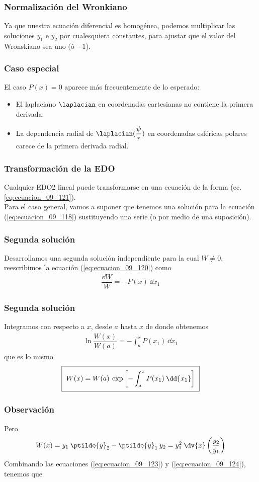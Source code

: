 \begin{frame}
\frametitle{Normalización del Wronkiano}
Ya que nuestra ecuación diferencial es homogénea, podemos multiplicar las soluciones $y_{1}$ e $y_{2}$ por cualesquiera constantes, para ajustar que el valor del Wronskiano sea uno (ó $-1$).
\end{frame}
\begin{frame}
\frametitle{Caso especial}
El caso $P(x) = 0$ aparece más frecuentemente de lo esperado:
\begin{itemize}
\item El laplaciano $\laplacian$ en coordenadas cartesianas no contiene la primera derivada.
\item La dependencia radial de $\laplacian (\dfrac{\psi}{r})$ en coordenadas esféricas polares carece de la primera derivada radial.
\end{itemize}
\end{frame}
\begin{frame}
\frametitle{Transformación de la EDO}
Cualquier EDO2 lineal puede transformarse en una ecuación de la forma (ec. \ref{eq:ecuacion_09_121}).
\\
\bigskip
Para el caso general, vamos a suponer que tenemos una solución para la ecuación (\ref{eq:ecuacion_09_118}) sustituyendo una serie (o por medio de una suposición). 
\end{frame}
\begin{frame}
\frametitle{Segunda solución}
Desarrollamos una segunda solución independiente para la cual $W \neq 0$, reescribimos la ecuación (\ref{eq:ecuacion_09_120}) como
\begin{align*}
\dfrac{\dd{W}}{W} = - P(x) \: \dd{x_{1}}
\end{align*}
\end{frame}
\begin{frame}
\frametitle{Segunda solución}
Integramos con respecto a $x$, desde $a$ hasta $x$ de donde obtenemos
\begin{align*}
\ln \dfrac{W(x)}{W(a)} = - \int_{a}^{x} P(x_{1}) \: \dd{x_{1}}
\end{align*}
\pause
que es lo mismo
\begin{align}
\setlength{\fboxsep}{2\fboxsep}\boxed{W(x) = W(a) \: \exp \left[ - \int_{a}^{x} P(x_{1}) \: \dd{x_{1}} \right]}
\label{eq:ecuacion_09_123}
\end{align}
\end{frame}
\begin{frame}
\frametitle{Observación}
Pero
\begin{align}
W(x) = y_{1} \: \ptilde{y}_{2} - \ptilde{y}_{1} \: y_{2} = y_{1}^{2} \: \dv{x} \left( \dfrac{y_{2}}{y_{1}} \right)
\label{eq:ecuacion_09_124}
\end{align}
Combinando las ecuaciones (\ref{eq:ecuacion_09_123}) y (\ref{eq:ecuacion_09_124}), tenemos que
\end{frame}
